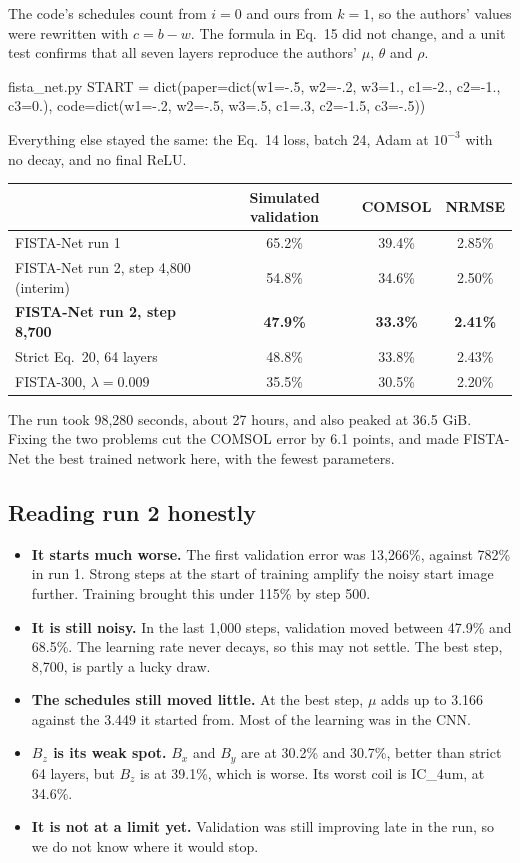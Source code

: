 The code's schedules count from $i=0$ and ours from $k=1$, so the authors' values were rewritten with $c=b-w$. The formula in
Eq.~15 did not change, and a unit test confirms that all seven layers reproduce the authors' $\mu$, $\theta$ and $\rho$.

\begin{code*}{fista_net.py}
START = dict(paper=dict(w1=-.5, w2=-.2, w3=1., c1=-2., c2=-1., c3=0.),
             code=dict(w1=-.2, w2=-.5, w3=.5, c1=.3, c2=-1.5, c3=-.5))
\end{code*}

Everything else stayed the same: the Eq.~14 loss, batch 24, Adam at $10^{-3}$ with no decay, and no final ReLU.

\begin{center}
\begin{tabular}{lccc}
\toprule
 & Simulated validation & COMSOL & NRMSE \\
\midrule
FISTA-Net run 1 & 65.2\% & 39.4\% & 2.85\% \\
FISTA-Net run 2, step 4,800 (interim) & 54.8\% & 34.6\% & 2.50\% \\
\textbf{FISTA-Net run 2, step 8,700} & \textbf{47.9\%} & \textbf{33.3\%} & \textbf{2.41\%} \\
Strict Eq.~20, 64 layers & 48.8\% & 33.8\% & 2.43\% \\
FISTA-300, $\lambda=0.009$ & 35.5\% & 30.5\% & 2.20\% \\
\bottomrule
\end{tabular}
\end{center}

The run took 98,280 seconds, about 27 hours, and also peaked at 36.5 GiB. Fixing the two problems cut the COMSOL error by 6.1
points, and made FISTA-Net the best trained network here, with the fewest parameters.

\subsection*{Reading run 2 honestly}

\begin{itemize}
\item \textbf{It starts much worse.} The first validation error was 13,266\%, against 782\% in run 1. Strong steps
at the start of training amplify the noisy start image further. Training brought this under 115\% by step 500.
\item \textbf{It is still noisy.} In the last 1,000 steps, validation moved between 47.9\% and 68.5\%. The learning rate
never decays, so this may not settle. The best step, 8,700, is partly a lucky draw.
\item \textbf{The schedules still moved little.} At the best step, $\mu$ adds up to 3.166 against the 3.449 it started
from. Most of the learning was in the CNN.
\item \textbf{$B_z$ is its weak spot.} $B_x$ and $B_y$ are at 30.2\% and 30.7\%, better than strict 64 layers, but $B_z$ is at
39.1\%, which is worse. Its worst coil is IC\_4um, at 34.6\%.
\item \textbf{It is not at a limit yet.} Validation was still improving late in the run, so we do not know where it would stop.
\end{itemize}

